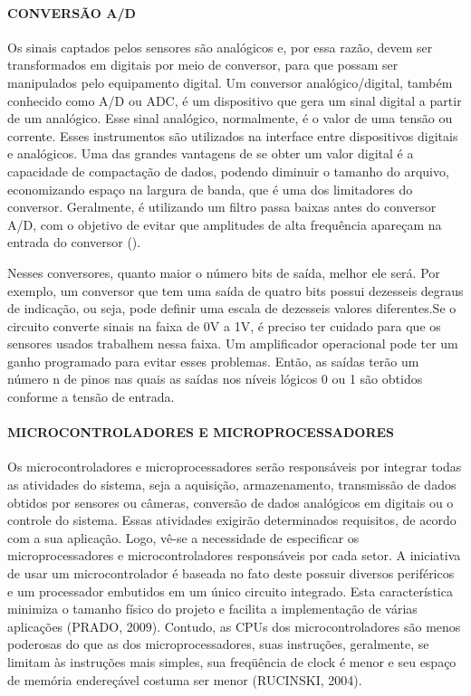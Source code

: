   \paragraph{CONVERSÃO A/D}
    Os sinais captados pelos sensores são analógicos e, por essa razão, devem ser transformados em digitais por meio de conversor, para que possam ser manipulados pelo equipamento digital.
Um conversor analógico/digital, também conhecido como A/D ou ADC, é um dispositivo que gera um sinal digital a partir de um analógico. Esse sinal analógico, normalmente, é o valor de uma tensão ou corrente. Esses instrumentos são utilizados na interface entre dispositivos digitais e analógicos. Uma das grandes vantagens de se obter um valor digital é a capacidade de compactação de dados, podendo diminuir o tamanho do arquivo, economizando espaço na largura de banda, que é uma dos limitadores do conversor. Geralmente, é utilizando um filtro passa baixas antes do conversor A/D, com o objetivo de evitar que amplitudes de alta frequência apareçam na entrada do conversor ().

    Nesses conversores, quanto maior o número bits de saída, melhor ele será. Por exemplo, um conversor que tem uma saída de quatro bits possui dezesseis degraus de indicação, ou seja, pode definir uma escala de dezesseis valores diferentes.Se o circuito converte sinais na faixa de 0V a 1V, é preciso ter cuidado para que os sensores usados trabalhem nessa faixa. Um amplificador operacional pode ter um ganho programado para evitar esses problemas. Então, as saídas terão um número n de pinos nas quais as saídas nos níveis lógicos 0 ou 1 são obtidos conforme a tensão de entrada.
    
  \paragraph{MICROCONTROLADORES E MICROPROCESSADORES}
    Os microcontroladores e microprocessadores serão responsáveis por integrar todas as atividades do sistema, seja a aquisição, armazenamento, transmissão de dados obtidos por sensores ou câmeras, conversão de dados analógicos em digitais ou o controle do sistema. Essas atividades exigirão determinados requisitos, de acordo com a sua aplicação. Logo, vê-se a necessidade de especificar os microprocessadores e microcontroladores responsáveis por cada setor. A iniciativa de usar um microcontrolador é baseada no fato deste possuir diversos periféricos e um processador embutidos em um único circuito integrado. Esta característica minimiza o tamanho físico do projeto e facilita a implementação de várias aplicações (PRADO, 2009).  Contudo, as CPUs dos microcontroladores são menos poderosas do que as dos microprocessadores, suas instruções, geralmente, se limitam às instruções mais simples, sua freqüência de clock é menor e seu espaço de memória endereçável costuma ser menor (RUCINSKI, 2004).
    
